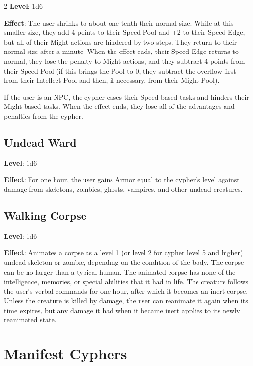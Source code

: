 \begin{multicols}{2}
\textbf{Level}: 1d6 

\textbf{Effect}: The user shrinks to about one-tenth their normal size. While at this smaller size, they add 4 points to their Speed Pool and +2 to their Speed Edge, but all of their Might actions are hindered by two steps. They return to their normal size after a minute. When the effect ends, their Speed Edge returns to normal, they lose the penalty to Might actions, and they subtract 4 points from their Speed Pool (if this brings the Pool to 0, they subtract the overflow first from their Intellect Pool and then, if necessary, from their Might Pool). 

If the user is an NPC, the cypher eases their Speed-based tasks and hinders their Might-based tasks. When the effect ends, they lose all of the advantages and penalties from the cypher. 

\subsection{Undead Ward}

\textbf{Level}: 1d6 

\textbf{Effect}: For one hour, the user gains Armor equal to the cypher’s level against damage from skeletons, zombies, ghosts, vampires, and other undead creatures. 

\subsection{Walking Corpse}

\textbf{Level}: 1d6 

\textbf{Effect}: Animates a corpse as a level 1 (or level 2 for cypher level 5 and higher) undead skeleton or zombie, depending on the condition of the body. The corpse can be no larger than a typical human. The animated corpse has none of the intelligence, memories, or special abilities that it had in life. The creature follows the user’s verbal commands for one hour, after which it becomes an inert corpse. Unless the creature is killed by damage, the user can reanimate it again when its time expires, but any damage it had when it became inert applies to its newly reanimated state.

\section{Manifest Cyphers}


\end{multicols}
